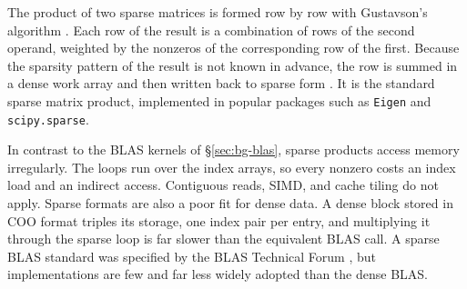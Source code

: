 The product of two sparse matrices is formed row by row with Gustavson's algorithm
\cite{gustavson1978two}.
Each row of the result is a combination of rows of the second operand, weighted by the
nonzeros of the corresponding row of the first.
Because the sparsity pattern of the result is not known in advance, the row is summed in a
dense work array and then written back to sparse form \cite{bank1993smmp}.
It is the standard sparse matrix product, implemented in popular
packages such as \texttt{Eigen} \cite{guennebaud2010eigen} and \texttt{scipy.sparse}.

In contrast to the BLAS kernels of \S\ref{sec:bg-blas}, sparse products access memory
irregularly.
The loops run over the index arrays, so every nonzero costs an index load and an indirect
access. Contiguous reads, \ac{SIMD}, and cache tiling do not apply.
Sparse formats are also a poor fit for dense data.
A dense block stored in \ac{COO} format triples its storage, one index pair per entry, and
multiplying it through the sparse loop is far slower than the equivalent BLAS call.
A sparse BLAS standard was specified by the BLAS Technical Forum \cite{duff2002sparse}, but
implementations are few and far less widely adopted than the dense BLAS.

